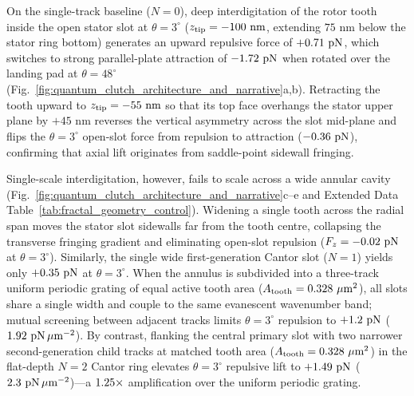 \documentclass[pdflatex,sn-nature]{sn-jnl}
\DeclareRobustCommand{\roundtwo}[1]{\fpeval{round(#1,2)}}
\DeclareRobustCommand{\roundthree}[1]{\fpeval{round(#1,3)}}
\begin{document}
On the single-track baseline ($N=0$), deep interdigitation of the rotor tooth inside the open stator slot at $\theta=3^\circ$ ($z_{\rm tip} = -100\text{ nm}$, extending $75\text{ nm}$ below the stator ring bottom) generates an upward repulsive force of $+\roundtwo{\SingletoothTrackzeroBemThetathreeFZPn}\text{ pN}$, which switches to strong parallel-plate attraction of $\roundtwo{\SingletoothTrackzeroBemThetafoureightFZPn}\text{ pN}$ when rotated over the landing pad at $\theta=48^\circ$ (Fig.~\ref{fig:quantum_clutch_architecture_and_narrative}a,b). Retracting the tooth upward to $z_{\rm tip} = -55\text{ nm}$ so that its top face overhangs the stator upper plane by $+45\text{ nm}$ reverses the vertical asymmetry across the slot mid-plane and flips the $\theta=3^\circ$ open-slot force from repulsion to attraction ($\roundtwo{\SingletoothTrackzeroOverhangBemThetathreeFZPn}\text{ pN}$), confirming that axial lift originates from saddle-point sidewall fringing\cite{levin2010}.

Single-scale interdigitation, however, fails to scale across a wide annular cavity (Fig.~\ref{fig:quantum_clutch_architecture_and_narrative}c--e and Extended Data Table~\ref{tab:fractal_geometry_control}). Widening a single tooth across the radial span moves the stator slot sidewalls far from the tooth centre, collapsing the transverse fringing gradient and eliminating open-slot repulsion ($F_z = \roundtwo{\CtrlSinglewideBemThetathreeFZPn}\text{ pN}$ at $\theta=3^\circ$). Similarly, the single wide first-generation Cantor slot ($N=1$) yields only $+\roundtwo{\FractalNoneFundringBemThetathreeFZPn}\text{ pN}$ at $\theta=3^\circ$. When the annulus is subdivided into a three-track uniform periodic grating of equal active tooth area ($A_{\rm tooth} = \roundthree{\FractalCtrlUniformperiodicActiveToothAreaUmtwo}\ \mu\text{m}^2$), all slots share a single width and couple to the same evanescent wavenumber band; mutual screening between adjacent tracks limits $\theta=3^\circ$ repulsion to $+\roundtwo{\CtrlUniformperiodicBemThetathreeFZPn}\text{ pN}$ ($\roundtwo{\FractalCtrlUniformperiodicFRepPnPerUmtwo}\text{ pN}\,\mu\text{m}^{-2}$). By contrast, flanking the central primary slot with two narrower second-generation child tracks at matched tooth area ($A_{\rm tooth} = \roundthree{\FractalCantorFlatzActiveToothAreaUmtwo}\ \mu\text{m}^2$) in the flat-depth $N=2$ Cantor ring elevates $\theta=3^\circ$ repulsive lift to $+\roundtwo{\CantorNtwoFlatzBemThetathreeFZPn}\text{ pN}$ ($\roundtwo{\FractalCantorFlatzFRepPnPerUmtwo}\text{ pN}\,\mu\text{m}^{-2}$)---a $1.25{}\times$ amplification over the uniform periodic grating.
\end{document}
